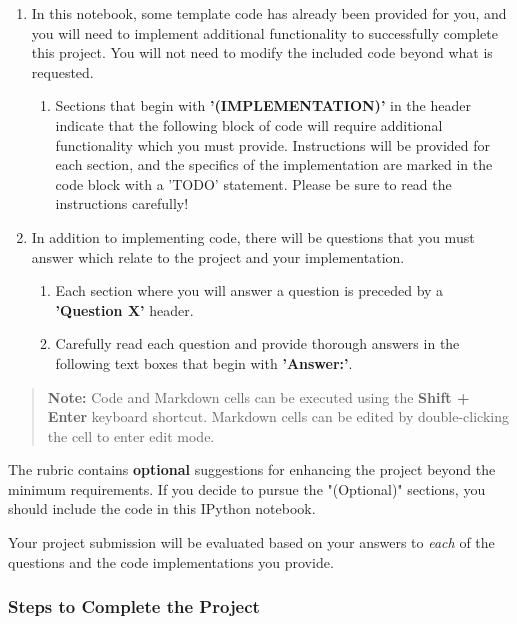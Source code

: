 \documentclass[11pt]{article}
\providecommand{\tightlist}{%
      \setlength{\itemsep}{0pt}\setlength{\parskip}{0pt}}
\begin{document}
\begin{enumerate}
\def\labelenumi{\arabic{enumi}.}
\item
  In this notebook, some template code has already been provided for
  you, and you will need to implement additional functionality to
  successfully complete this project. You will not need to modify the
  included code beyond what is requested.

  \begin{enumerate}
  \def\labelenumii{\alph{enumii}.}
  \tightlist
  \item
    Sections that begin with \textbf{'(IMPLEMENTATION)'} in the header
    indicate that the following block of code will require additional
    functionality which you must provide. Instructions will be provided
    for each section, and the specifics of the implementation are marked
    in the code block with a 'TODO' statement. Please be sure to read
    the instructions carefully!
  \end{enumerate}
\item
  In addition to implementing code, there will be questions that you
  must answer which relate to the project and your implementation.

  \begin{enumerate}
  \def\labelenumii{\alph{enumii}.}
  \item
    Each section where you will answer a question is preceded by a
    \textbf{'Question X'} header.
  \item
    Carefully read each question and provide thorough answers in the
    following text boxes that begin with \textbf{'Answer:'}.
  \end{enumerate}
\end{enumerate}

\begin{quote}
\textbf{Note:} Code and Markdown cells can be executed using the
\textbf{Shift + Enter} keyboard shortcut. Markdown cells can be edited
by double-clicking the cell to enter edit mode.
\end{quote}

The rubric contains \textbf{optional} suggestions for enhancing the
project beyond the minimum requirements. If you decide to pursue the
"(Optional)" sections, you should include the code in this IPython
notebook.

Your project submission will be evaluated based on your answers to
\emph{each} of the questions and the code implementations you provide.

    \subsubsection{Steps to Complete the
Project}\label{steps-to-complete-the-project}
\end{document}
